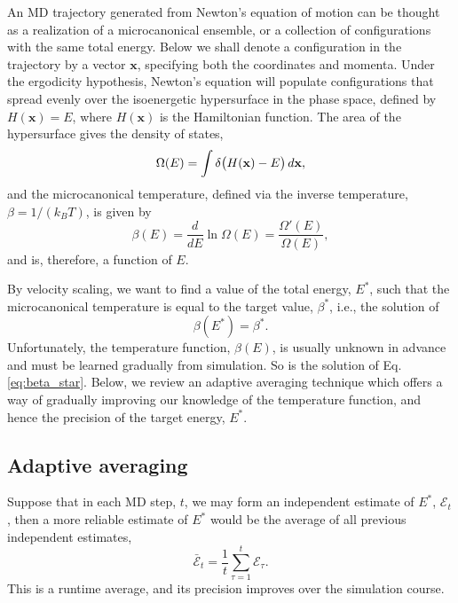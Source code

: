 \documentclass[preprint]{revtex4-1}
\begin{document}
An MD trajectory generated from
Newton's equation of motion
can be thought as a realization
of a microcanonical ensemble,
or a collection of configurations
with the same total energy.
%
Below we shall denote a configuration in the trajectory
by a vector $\mathbf x$,
specifying both the coordinates and momenta.
%
Under the ergodicity hypothesis,
Newton's equation will populate configurations
that spread evenly over
the isoenergetic hypersurface in the phase space,
defined by
$H(\mathbf x) = E$,
where $H(\mathbf x)$ is the Hamiltonian function.
%
The area of the hypersurface gives the density of states,
%
\begin{equation}
  \Omega(E)
  =
  \int
    \delta\bigl( H(\mathbf x) - E \bigr)
    \, d\mathbf x
  ,
  \notag
\end{equation}
%
and the microcanonical temperature,
defined via the inverse temperature,
$\beta = 1/(k_B T)$,
is given by
%
\begin{equation}
  \beta(E)
  =
  \frac{ d }{ dE }
  \ln \Omega(E)
  =
  \frac{ \Omega'(E) }
       { \Omega(E)  }
  ,
  \label{eq:betaE_def}
\end{equation}
%
and is, therefore, a function of $E$.
%

By velocity scaling, we want to
find a value of the total energy, $E^*$,
such that the microcanonical temperature
is equal to the target value, $\beta^*$,
i.e., the solution of
%
\begin{equation}
  \beta(E^*)
  =
  \beta^*
  .
  \label{eq:beta_star}
\end{equation}
%
Unfortunately, the temperature function, $\beta(E)$,
is usually unknown in advance
and must be learned gradually from simulation.
%
So is the solution of Eq. \eqref{eq:beta_star}.
%
Below, we review an adaptive averaging technique
which offers a way of gradually improving
our knowledge of the temperature function,
and hence the precision of the target energy, $E^*$.



\subsection{Adaptive averaging}



Suppose that in each MD step, $t$,
we may form an independent estimate of $E^*$,
$\mathcal E_t$,
then a more reliable estimate of $E^*$
would be the average of
all previous independent estimates,
%
\begin{equation}
  \bar{\mathcal E}_t
  =
  \frac 1 t
  \sum_{\tau = 1}^t
    \mathcal E_\tau
  .
  \label{eq:Epsave}
\end{equation}
%
This is a runtime average,
and its precision improves over the simulation course.
\end{document}
